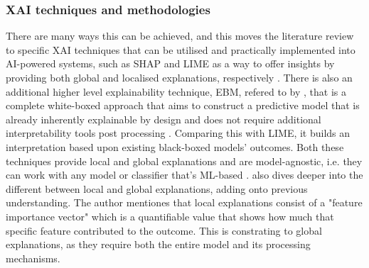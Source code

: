 
\subsubsection*{XAI techniques and methodologies}
There are many ways this can be achieved, and this moves the literature review to specific XAI techniques that can be utilised and practically implemented into AI-powered systems, such as SHAP and LIME as a way to offer insights \citep{shendkar2024enhancing} by providing both global and localised explanations, respectively \citep{palaniappan2020malicious}. There is also an additional higher level explainability technique, EBM, refered to by \cite{hernandes2021phishing}, that is a complete white-boxed approach that aims to construct a predictive model that is already inherently explainable by design and does not require additional interpretability tools post processing \citep{greco2023explaining}. Comparing this with LIME, it builds an interpretation based upon existing black-boxed models' outcomes. Both these techniques provide local and global explanations and are model-agnostic, i.e. they can work with any model or classifier that's ML-based \citep{anderson2015polymorphic}. \cite{greco2023explaining} also dives deeper into the different between local and global explanations, adding onto previous understanding. The author mentiones that local explanations consist of a "feature importance vector" which is a quantifiable value that shows how much that specific feature contributed to the outcome. This is constrating to global explanations, as they require both the entire model and its processing mechanisms.
